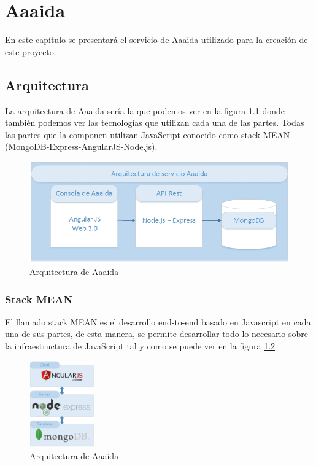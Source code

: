 \chapter{Aaaida}

En este capítulo se presentará el servicio de Aaaida utilizado para la creación de este proyecto. 

\section{Arquitectura}

La arquitectura de Aaaida sería la que podemos ver en la figura \ref{a:arquitectura} donde también podemos ver las tecnologías que utilizan cada una de las partes. Todas las partes que la componen utilizan JavaScript conocido como stack MEAN (MongoDB-Express-AngularJS-Node.js). 

\begin{figure}[htb]
\begin{center}
\includegraphics[width=1\textwidth]{./setup/arquitectura}
\caption{Arquitectura de Aaaida}
\label{a:arquitectura}
\end{center}
\end{figure}

\subsection{Stack MEAN}

El llamado stack MEAN es el desarrollo end-to-end basado en Javascript en
cada una de sus partes, de esta manera, se permite desarrollar todo lo necesario
sobre la infraestructura de JavaScript tal y como se puede ver en la figura \ref{mean:MEAN}

\begin{figure}[htb]
\begin{center}
\includegraphics[width=0.25\textwidth]{./setup/MEAN}
\caption{Arquitectura de Aaaida}
\label{mean:MEAN}
\end{center}
\end{figure}

